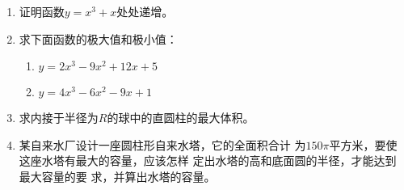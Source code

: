 \begin{example}
    
\end{example}

\begin{solution}
    
\end{solution}















\begin{ex}
\begin{enumerate}
    \item 证明函数$y=x^3+x$处处递增。
    \item 求下面函数的极大值和极小值：
\begin{enumerate}
    \item $y=2x^3-9x^2+12x+5$
    \item $y=4x^3-6x^2-9x+1$
\end{enumerate}
    \item 求内接于半径为$R$的球中的直圆柱的最大体积。
    \item 某自来水厂设计一座圆柱形自来水塔，它的全面积合计
    为$150\pi$平方米，要使这座水塔有最大的容量，应该怎样
    定出水塔的高和底面圆的半径，才能达到最大容量的要
    求，并算出水塔的容量。
\end{enumerate}
\end{ex}

